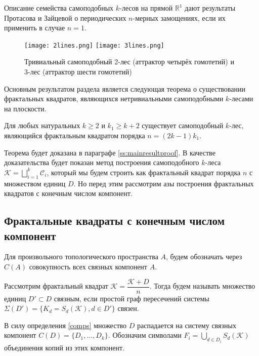Описание семейства самоподобных $k$-лесов на  прямой $\mathbb R^1$ дают результаты Протасова и Зайцевой \cite{Zaitseva2021, Zaitseva2022} о периодических $n$-мерных замощениях, если их применить в случае $n=1$.

\begin{figure}[h]
\texttt{[image: 2lines.png]}
\texttt{[image: 3lines.png]}
\caption{Тривиальный самоподобный 2-лес (аттрактор четырёх гомотетий) и 3-лес (аттрактор шести гомотетий)}
\label{fig:trivial}
\end{figure}


Основным результатом раздела является следующая теорема о существовании фрактальных квадратов,  являющихся нетривиальными самоподобными $k$-лесами на плоскости.

\begin{theorem}\label{thm:mainresult}
Для любых натуральных $k\geq2$  и  $ k_1\ge k+2$ существует самоподобный $k$-лес, являющийся фрактальным квадратом порядка $n=(2k-1)k_1$.
\end{theorem} 

Теорема будет доказана в параграфе \ref{ss:mainresultproof}.
В качестве доказательства будет показан метод построения самоподобного $k$-леса ${\mathcal{K}}=\bigsqcup_{i=1}^k\mathcal{C}_i$, который мы будем строить как  фрактальный квадрат порядка $n$ с множеством единиц $D$.
Но перед этим рассмотрим азы построения фрактальных квадратов с конечным числом компонент.


\subsection{Фрактальные квадраты с конечным числом компонент}

Для произвольного  топологического пространства  $A$, будем обозначать через $C(A)$  совокупность всех связных компонент $A$.

\begin{definition}\label{comps}
Рассмотрим фрактальный квадрат ${\mathcal{K}}=\dfrac{{\mathcal{K}}+D}{n}$.
Тогда будем называть множество единиц $D'\subset D$ связным, если простой граф пересечений системы $\Sigma(D')=\{ K_d=S_d({\mathcal{K}}), d \in D'\}$ связен.
\end{definition}

В силу определения \ref{comps} множество $D$ распадается  на систему связных компонент  $C(D)=\{D_1,\ldots,D_k\}$.
Обозначим символами $F_i=\bigcup\limits_{d\in D_i}S_d({\mathcal{K}})$ объединения копий из этих компонент.

